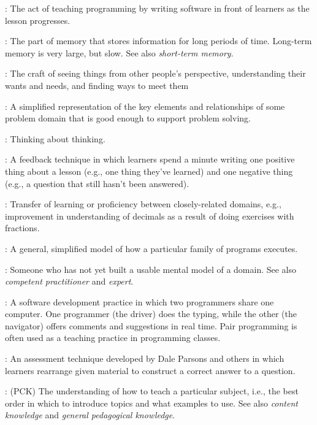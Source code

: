 \begin{description}
: The act of teaching programming
by writing software in front of learners as the lesson progresses.

: The part of memory
that stores information for long periods of time. Long-term memory is
very large, but slow. See also \emph{short-term memory}.

: The craft of seeing things from
other people's perspective, understanding their wants and needs, and
finding ways to meet them

: A simplified representation
of the key elements and relationships of some problem domain that is
good enough to support problem solving.

: Thinking about thinking.

: A feedback technique in which
learners spend a minute writing one positive thing about a lesson (e.g.,
one thing they've learned) and one negative thing (e.g., a question that
still hasn't been answered).

: Transfer of learning or
proficiency between closely-related domains, e.g., improvement in
understanding of decimals as a result of doing exercises with fractions.

: A general, simplified
model of how a particular family of programs executes.

: Someone who has not yet built a usable
mental model of a domain. See also \emph{competent practitioner} and
\emph{expert}.

: A software
development practice in which two programmers share one computer. One
programmer (the driver) does the typing, while the other (the navigator)
offers comments and suggestions in real time. Pair programming is often
used as a teaching practice in programming classes.

: An assessment technique
developed by Dale Parsons and others in which learners rearrange given
material to construct a correct answer to a question.

:
(PCK) The understanding of how to teach a particular subject, i.e., the
best order in which to introduce topics and what examples to use. See
also \emph{content knowledge} and \emph{general pedagogical knowledge}.


\end{description}
